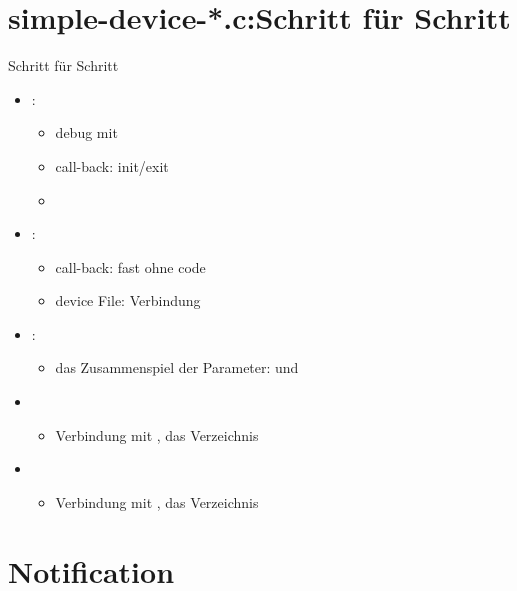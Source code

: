 \documentclass{beamer}
\begin{document}
\section{simple-device-*.c:Schritt für Schritt}
\begin{frame}{}{Schritt für Schritt}
 \begin{itemize}
  \item {}:
  \begin{itemize}
   \item debug mit 
   \item call-back: init/exit
   \item {}
  \end{itemize}
  \item {}:
  \begin{itemize}
   \item call-back:  fast ohne code
   \item device File: Verbindung 
  \end{itemize}
  \item {}:
  \begin{itemize}
   \item das Zusammenspiel der Parameter:  und 
  \end{itemize}
  \item {}
  \begin{itemize}
   \item Verbindung mit \usp, das Verzeichnis 
  \end{itemize}
  \item {}
  \begin{itemize}
   \item Verbindung mit \usp, das Verzeichnis 
  \end{itemize}
 \end{itemize}
\end{frame}











\section{Notification}


\end{document}
